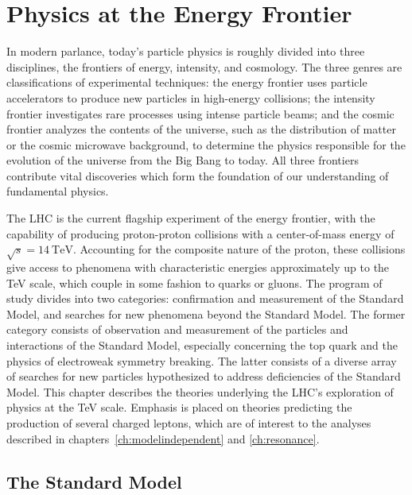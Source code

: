 \chapter{Physics at the Energy Frontier}\label{ch:theory}
In modern parlance, today's particle physics is roughly divided into three disciplines, the frontiers of energy, intensity, and cosmology. The three genres are classifications of experimental techniques:  the energy frontier uses particle accelerators to produce new particles in high-energy collisions; the intensity frontier investigates rare processes using intense particle beams; and the cosmic frontier analyzes the contents of the universe, such as the distribution of matter or the cosmic microwave background, to determine the physics responsible for the evolution of the universe from the Big Bang to today. All three frontiers contribute vital discoveries which form the foundation of our understanding of fundamental physics. 

The LHC is the current flagship experiment of the energy frontier, with the capability of producing proton-proton collisions with a center-of-mass energy of $\sqrt{s}=14~\mbox{TeV}$. Accounting for the composite nature of the proton, these collisions give access to phenomena with characteristic energies approximately up to the TeV scale, which couple in some fashion to quarks or gluons. The program of study divides into two categories: confirmation and measurement of the Standard Model, and searches for new phenomena beyond the Standard Model. The former category consists of observation and measurement of the particles and interactions of the Standard Model, especially concerning the top quark and the physics of electroweak symmetry breaking. The latter consists of a diverse array of searches for new particles hypothesized to address deficiencies of the Standard Model. This chapter describes the theories underlying the LHC's exploration of physics at the TeV scale. Emphasis is placed on theories predicting the production of several charged leptons, which are of interest to the analyses described in chapters~\ref{ch:modelindependent} and \ref{ch:resonance}. 



\section{The Standard Model}
